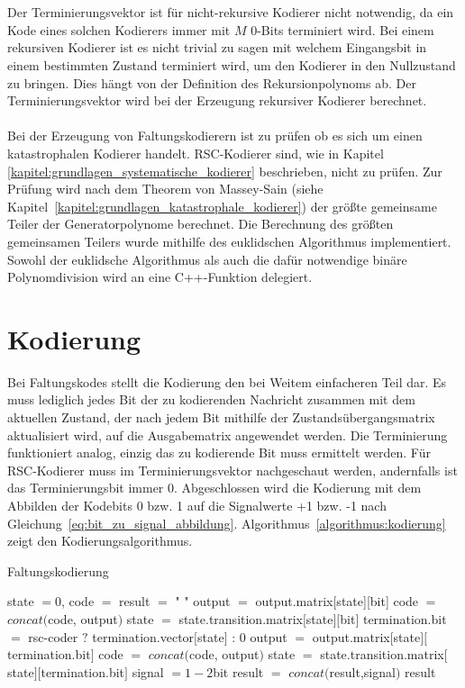\\
\\
Der Terminierungsvektor ist für nicht-rekursive Kodierer nicht notwendig, da ein Kode eines solchen Kodierers immer mit $M$ 0-Bits terminiert wird. Bei einem rekursiven Kodierer ist es nicht trivial zu sagen mit welchem Eingangsbit in einem bestimmten Zustand terminiert wird, um den Kodierer in den Nullzustand zu bringen. Dies hängt von der Definition des Rekursionpolynoms ab. Der Terminierungsvektor wird bei der Erzeugung rekursiver Kodierer berechnet.
\\
\\
Bei der Erzeugung von Faltungskodierern ist zu prüfen ob es sich um einen katastrophalen Kodierer handelt. RSC-Kodierer sind, wie in Kapitel \ref{kapitel:grundlagen_systematische_kodierer} beschrieben, nicht zu prüfen. Zur Prüfung wird nach dem Theorem von Massey-Sain (siehe Kapitel~\ref{kapitel:grundlagen_katastrophale_kodierer}) der größte gemeinsame Teiler der Generatorpolynome berechnet. Die Berechnung des größten gemeinsamen Teilers wurde mithilfe des euklidschen Algorithmus implementiert. Sowohl der euklidsche Algorithmus als auch die dafür notwendige binäre Polynomdivision wird an eine C++-Funktion delegiert.

\section{Kodierung}
\label{kapitel:implementierung_kodierung}
Bei Faltungskodes stellt die Kodierung den bei Weitem einfacheren Teil dar. Es muss lediglich jedes Bit der zu kodierenden Nachricht zusammen mit dem aktuellen Zustand, der nach jedem Bit mithilfe der Zustandsübergangsmatrix aktualisiert wird, auf die Ausgabematrix angewendet werden. Die Terminierung funktioniert analog, einzig das zu kodierende Bit muss ermittelt werden. Für RSC-Kodierer muss im Terminierungsvektor nachgeschaut werden, andernfalls ist das Terminierungsbit immer 0. Abgeschlossen wird die Kodierung mit dem Abbilden der Kodebits 0 bzw. 1 auf die Signalwerte +1 bzw. -1 nach Gleichung~\eqref{eq:bit_zu_signal_abbildung}. Algorithmus~\ref{algorithmus:kodierung} zeigt den Kodierungsalgorithmus.

\begin{algorithm}[H]
\renewcommand{\algorithmicforall}{\textbf{for each}}
\caption{Faltungskodierung}
\label{algorithmus:kodierung}
\begin{algorithmic}[1]
\STATE state $=0$, code $=$ result $=$ " "
   \STATE output $=$ output.matrix[state][bit]
	\STATE code $=$ $concat($code, output$)$
	\STATE state $=$ state.transition.matrix$[$state$][$bit$]$
\ENDFOR
{}
      \STATE termination.bit $=$ rsc-coder $?$ termination.vector$[$state$]$ : $0$
      \STATE output $=$ output.matrix$[$state$][$termination.bit$]$
	   \STATE code $=$ $concat($code, output$)$
	   \STATE state $=$ state.transition.matrix$[$state$][$termination.bit$]$
   \ENDFOR
\ENDIF
{}
   \STATE signal $=1-2$bit
   \STATE result $=$ $concat($result,signal$)$
\ENDFOR
\RETURN result
\end{algorithmic}
\end{algorithm}

